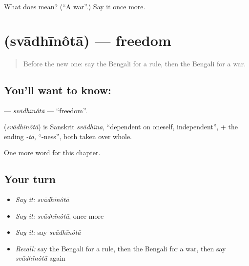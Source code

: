 \begin{tcolorbox}[breakable,colback=teal!4,colframe=teal!35!black,title={Before you move on}]
What does  mean? (\textquotedblleft{}A war\textquotedblright{}.) Say it once more.
\end{tcolorbox}
\section[\texorpdfstring{\bn{স্বাধীনতা} (svādhīnôtā)}{স্বাধীনতা (svādhīnôtā)}]{ (svādhīnôtā) — freedom}

\label{lesson:BN-C200-svadhinota}



\begin{quote}
Before the new one: say the Bengali for a rule, then the Bengali for a war.
\end{quote}

\subsection*{You'll want to know: }
\textbf{} — \emph{svādhīnôtā} — \textquotedblleft{}freedom\textquotedblright{}.

\begin{cousinweb}
\textbf{} (\emph{svādhīnôtā}) is Sanskrit \emph{svādhīna}, \textquotedblleft{}dependent on oneself, independent\textquotedblright{}, + the ending \emph{-tā}, \textquotedblleft{}-ness\textquotedblright{}, both taken over whole.
\end{cousinweb}

\begin{grammarlens}[title={What you've built}]
One more word for this chapter.
\end{grammarlens}

\subsection*{Your turn}
\begin{itemize}
\raggedright
  \item \emph{Say it:} \emph{svādhīnôtā}
  \item \emph{Say it:} \emph{svādhīnôtā}, once more
  \item \emph{Say it:} say \emph{svādhīnôtā}
  \item \emph{Recall:} say the Bengali for a rule, then the Bengali for a war, then say \emph{svādhīnôtā} again
\end{itemize}

